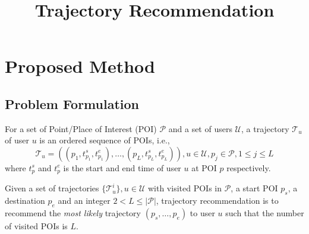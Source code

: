 \documentclass{sig-alternate-05-2015}
\begin{document}

\title{Trajectory Recommendation}


\maketitle




\section{Proposed Method}
\label{method}


\subsection{Problem Formulation}
\label{method:formulation}
For a set of Point/Place of Interest (POI) $\mathcal{P}$ and a set of users $\mathcal{U}$,
a trajectory $\mathcal{T}_u$ of user $u$ is an ordered sequence of POIs,
i.e.,
\begin{displaymath}
    \mathcal{T}_u = ((p_1, t_{p_1}^s, t_{p_{1}}^e), \dots, (p_L, t_{p_L}^s, t_{p_L}^e)), 
    u \in \mathcal{U}, 
    p_j \in \mathcal{P}, 1 \le j \le L
\end{displaymath}
where $t_p^s$ and $t_p^e$ is the start and end time of user $u$ at POI $p$ respectively.

Given a set of trajectories $\{ \mathcal{T}_u^i \}, u \in \mathcal{U}$ with visited POIs in $\mathcal{P}$, 
a start POI $p_s$, a destination $p_e$ and an integer $2 < L \le |\mathcal{P}|$,
trajectory recommendation is to recommend the \textit{most likely} trajectory $(p_s, \dots, p_e)$ to user $u$ such that
the number of visited POIs is $L$.
\end{document}
